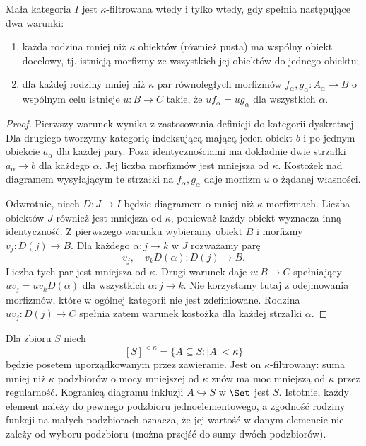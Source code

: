 \begin{stwierdzenie}\label{cat:prop:accessible-filtered-criterion}
Mała kategoria $I$ jest $\kappa$-filtrowana wtedy i tylko wtedy, gdy spełnia następujące dwa warunki:
\begin{enumerate}
 \item każda rodzina mniej niż $\kappa$ obiektów (również pusta) ma wspólny obiekt docelowy, tj. istnieją morfizmy ze wszystkich jej obiektów do jednego obiektu;
 \item dla każdej rodziny mniej niż $\kappa$ par równoległych morfizmów $f_\alpha,g_\alpha:A_\alpha\to B$ o wspólnym celu istnieje $u:B\to C$ takie, że $uf_\alpha=ug_\alpha$ dla wszystkich $\alpha$.
\end{enumerate}
\end{stwierdzenie}
\begin{proof}
Pierwszy warunek wynika z zastosowania definicji do kategorii dyskretnej. Dla drugiego tworzymy kategorię indeksującą mającą jeden obiekt $b$ i po jednym obiekcie $a_\alpha$ dla każdej pary. Poza identycznościami ma dokładnie dwie strzałki $a_\alpha\to b$ dla każdego $\alpha$. Jej liczba morfizmów jest mniejsza od $\kappa$. Kostożek nad diagramem wysyłającym te strzałki na $f_\alpha,g_\alpha$ daje morfizm $u$ o żądanej własności.

Odwrotnie, niech $D:J\to I$ będzie diagramem o mniej niż $\kappa$ morfizmach. Liczba obiektów $J$ również jest mniejsza od $\kappa$, ponieważ każdy obiekt wyznacza inną identyczność. Z pierwszego warunku wybieramy obiekt $B$ i morfizmy $v_j:D(j)\to B$. Dla każdego $\alpha:j\to k$ w $J$ rozważamy parę
\[
 v_j,\quad v_kD(\alpha):D(j)\longrightarrow B.
\]
Liczba tych par jest mniejsza od $\kappa$. Drugi warunek daje $u:B\to C$ spełniający $uv_j=uv_kD(\alpha)$ dla wszystkich $\alpha:j\to k$. Nie korzystamy tutaj z odejmowania morfizmów, które w ogólnej kategorii nie jest zdefiniowane. Rodzina $uv_j:D(j)\to C$ spełnia zatem warunek kostożka dla każdej strzałki $\alpha$.
\end{proof}

\begin{przyklad}\label{cat:ex:accessible-small-subsets}
Dla zbioru $S$ niech
\[
 [S]^{<\kappa}=\{A\subseteq S:|A|<\kappa\}
\]
będzie posetem uporządkowanym przez zawieranie. Jest on $\kappa$-filtrowany: suma mniej niż $\kappa$ podzbiorów o mocy mniejszej od $\kappa$ znów ma moc mniejszą od $\kappa$ przez regularność. Kogranicą diagramu inkluzji $A\hookrightarrow S$ w $\Set$ jest $S$. Istotnie, każdy element należy do pewnego podzbioru jednoelementowego, a zgodność rodziny funkcji na małych podzbiorach oznacza, że jej wartość w danym elemencie nie zależy od wyboru podzbioru (można przejść do sumy dwóch podzbiorów).
\end{przyklad}

